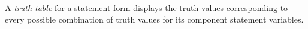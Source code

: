 \guard



\begin{defn}
\label{defn:truthTable}
  A \emph{truth table} for a statement form displays the truth values corresponding to every possible combination of truth values for its component statement variables.
\end{defn}
